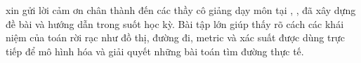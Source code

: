 
\Nhom{} xin gửi lời cảm ơn chân thành đến các thầy cô giảng dạy môn \TenMon{} tại
\Khoa{}, \Truong{}, đã xây dựng đề bài và hướng dẫn trong suốt học kỳ. Bài tập lớn giúp
\nhom{} thấy rõ cách các khái niệm của toán rời rạc như đồ thị, đường đi, metric và xác suất
được dùng trực tiếp để mô hình hóa và giải quyết những bài toán tìm đường thực tế.
